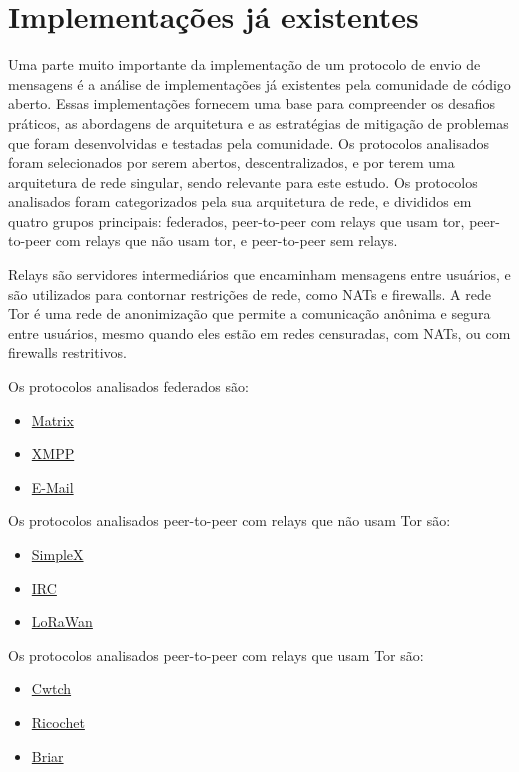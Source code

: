 
\chapter{Implementações já existentes}

Uma parte muito importante da implementação de um protocolo de envio de mensagens é a análise de implementações já existentes pela comunidade de código aberto. Essas implementações fornecem uma base para compreender os desafios práticos, as abordagens de arquitetura e as estratégias de mitigação de problemas que foram desenvolvidas e testadas pela comunidade. Os protocolos analisados foram selecionados por serem abertos, descentralizados, e por terem uma arquitetura de rede singular, sendo relevante para este estudo. Os protocolos analisados foram categorizados pela sua arquitetura de rede, e divididos em quatro grupos principais: federados, peer-to-peer com relays que usam tor, peer-to-peer com relays que não usam tor, e peer-to-peer sem relays. 

Relays são servidores intermediários que encaminham mensagens entre usuários, e são utilizados para contornar restrições de rede, como NATs e firewalls. A rede Tor é uma rede de anonimização que permite a comunicação anônima e segura entre usuários, mesmo quando eles estão em redes censuradas, com NATs, ou com firewalls restritivos.

Os protocolos analisados federados são:
\begin{itemize}
  \item \href{https://matrix.org/}{Matrix}
  \item \href{https://xmpp.org/}{XMPP}
  \item \href{https://en.wikipedia.org/wiki/Email}{E-Mail}
\end{itemize}

Os protocolos analisados peer-to-peer com relays que não usam Tor são:
\begin{itemize}
  \item \href{https://simplex.chat/}{SimpleX}
  \item \href{https://www.irc.org/}{IRC}
  \item \href{https://lora-alliance.org/}{LoRaWan}
\end{itemize}

Os protocolos analisados peer-to-peer com relays que usam Tor são:
\begin{itemize}
  \item \href{https://cwtch.im/}{Cwtch}
  \item \href{https://ricochet.im/}{Ricochet}
  \item \href{https://briarproject.org/}{Briar}
\end{itemize}

